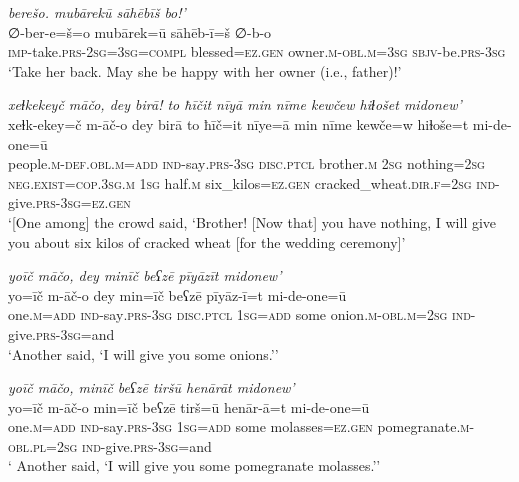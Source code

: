 \ea \label{ZP.106}
\textit{berešo. mubārekū sāhēbīš bo!’} \\ 
\gll ∅-ber-e=š=o mubārek=ū sāhēb-ī=š ∅-b-o \\ 
 \textsc{imp-}take\textsc{.prs}-\textsc{2sg}\textsc{=3sg}\textsc{=compl} blessed\textsc{\textsc{=ez.gen}} owner\textsc{.m}\textsc{-obl}\textsc{.m}\textsc{=3sg} \textsc{sbjv-}be\textsc{.prs}\textsc{-3sg} \\ 
\glt `Take her back. May she be happy with her owner (i.e., father)!'
\z 
 
\ea \label{ZP.118}
\textit{xeɫkekeyč māčo, dey birā! to ħīčit nīyā min nīme kewčew hiɫošet midonew’} \\ 
\gll xeɫk-ekey=č m-āč-o dey birā to ħīč=it nīye=ā min nīme kewče=w hiɫoše=t mi-de-one=ū \\ 
 people\textsc{.m}\textsc{-def}\textsc{.obl}\textsc{.m}\textsc{=add} \textsc{ind-}say\textsc{.prs}\textsc{-3sg} \textsc{disc.ptcl} brother\textsc{.m} \textsc{2sg} nothing\textsc{=\textsc{2sg}} \textsc{\textsc{neg.}exist}\textsc{=cop}\textsc{.3sg}\textsc{.m} \textsc{1sg} half\textsc{.m} six\_kilos\textsc{\textsc{=ez.gen}} cracked\_wheat\textsc{.dir}\textsc{.f}\textsc{=\textsc{2sg}} \textsc{ind-}give\textsc{.prs}\textsc{-3sg}\textsc{\textsc{=ez.gen}} \\ 
\glt `[One among] the crowd said, ‘Brother! [Now that] you have nothing, I will give you about six kilos of cracked wheat [for the wedding ceremony]'
\z 
 
\ea \label{ZP.119}
\textit{yoīč māčo, dey minīč beʕzē pīyāzīt midonew’} \\ 
\gll yo=īč m-āč-o dey min=īč beʕzē pīyāz-ī=t mi-de-one=ū \\ 
 one\textsc{.m}\textsc{=add} \textsc{ind-}say\textsc{.prs}\textsc{-3sg} \textsc{disc.ptcl} \textsc{1sg}\textsc{=add} some onion\textsc{.m}\textsc{-obl}\textsc{.m}\textsc{=\textsc{2sg}} \textsc{ind-}give\textsc{.prs}\textsc{-3sg}=and \\ 
\glt `Another said, ‘I will give you some onions.’'
\z 
 
\ea \label{ZP.120}
\textit{yoīč māčo, minīč beʕzē tiršū henārāt midonew’} \\ 
\gll yo=īč m-āč-o min=īč beʕzē tirš=ū henār-ā=t mi-de-one=ū \\ 
 one\textsc{.m}\textsc{=add} \textsc{ind-}say\textsc{.prs}\textsc{-3sg} \textsc{1sg}\textsc{=add} some molasses\textsc{\textsc{=ez.gen}} pomegranate\textsc{.m}\textsc{-obl}\textsc{.pl}\textsc{=\textsc{2sg}} \textsc{ind-}give\textsc{.prs}\textsc{-3sg}=and \\ 
\glt ` Another said, ‘I will give you some pomegranate molasses.’'
\z 
 
